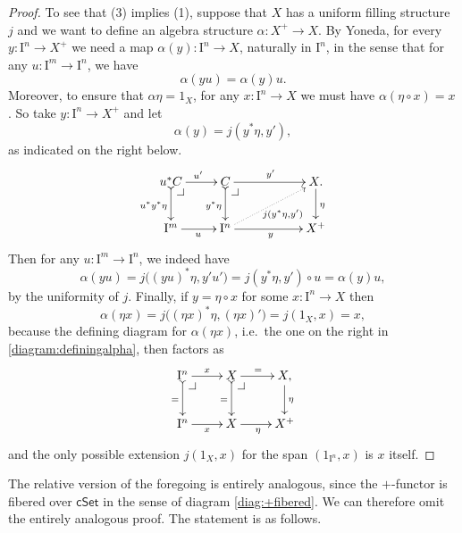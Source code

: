 \documentclass[11pt]{article}
\makeatletter
\newcommand{\cSet}{\ensuremath{\mathsf{cSet}}}
\newcommand{\pbcorner}[1][dr]{\save*!/#1-1.2pc/#1:(-1,1)@^{|-}\restore}
\newcommand{\I}{\ensuremath{\mathrm{I}}}
\theoremstyle{remark}
\theoremstyle{definition}
\makeatother
\begin{document}
\begin{proof}
To see that (3) implies (1), suppose that $X$ has a uniform filling structure $j$ and we want to define an algebra structure $\alpha : X^+ \to X$. By Yoneda, for every $y : \I^n \to X^+$ we need a map $\alpha(y) : \I^n \to X$, naturally in $\I^n$, in the sense that for any $u : \I^m \to \I^n$, we have
\begin{equation}\label{eq:proof,plusstructure}
\alpha(yu) = \alpha(y)u.
\end{equation}
Moreover, to ensure that $\alpha\eta = 1_X$, for any $x : \I^n \to X$ we must have $\alpha(\eta\circ x) = x$. So take $y : \I^n \to X^+$  and let $$\alpha(y) = j(y^*\eta, y'),$$
as indicated on the right below.
\begin{equation}\label{diagram:definingalpha}
\xymatrix{
u^*C \ar@{>->}[d]_{u^*y^*\eta} \ar[r]^{u'} \pbcorner &  C \ar@{>->}[d]_{y^*\eta} \ar[rr]^{y'}\pbcorner && X \ar[d]^\eta . \\
\I^{m} \ar[r]_{u} & \I^{n} \ar@{.>}[rru]_{j(y^*\eta,y')} \ar[rr]_{y} && X^+
}
\end{equation}
Then for any $u : \I^m \to \I^n$, we indeed have 
$$\alpha(yu) =  j\big( (yu)^*\eta, y'u' \big) = j(y^*\eta, y')\circ u = \alpha(y)u,$$
 by the uniformity of $j$. Finally, if $y=\eta\circ x$ for some $x : \I^n\to X$ then 
 $$\alpha(\eta x) =  j\big( (\eta x)^*\eta, (\eta x)'\big) = j(1_X, x) = x,$$
 because the defining diagram for $\alpha(\eta x)$, i.e.\ the one on the right in \eqref{diagram:definingalpha}, then factors as
 \begin{equation}\label{diagram:definingalphatwo}
\xymatrix{
\I^n \ar@{>->}[d]_{=} \ar[r]^{x} \pbcorner &  X \ar@{>->}[d]_{=} \ar[r]^{=}\pbcorner & X \ar[d]^\eta , \\
\I^{n} \ar[r]_{x} & X  \ar[r]_{\eta} & X^+
}
\end{equation}
and the only possible extension $j(1_X, x)$ for the span $(1_{\I^n}, x)$ is  $x$ itself.
 \end{proof}
 
The relative version of the foregoing is entirely analogous, since the $+$-functor is fibered over $\cSet$ in the sense of diagram \eqref{diag:+fibered}.  We can therefore omit the entirely analogous proof.  The statement is as follows.
 
\end{document}
